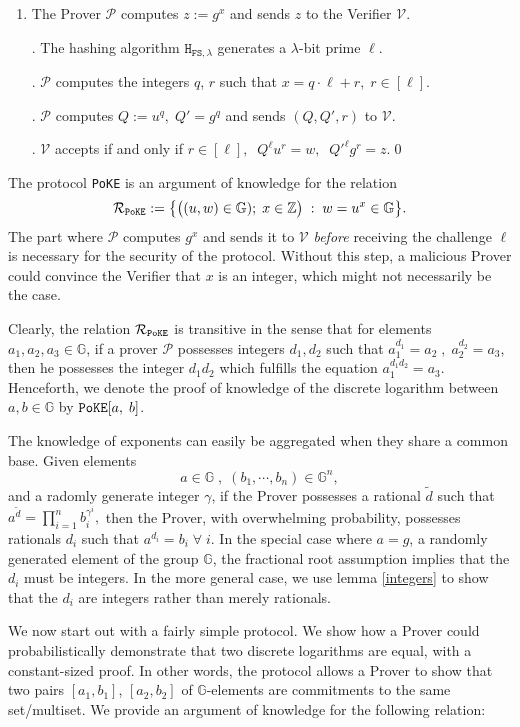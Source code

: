 \documentclass[11pt, lettersize, notitlepage, leqno, footskip=0.6cm]{article}
\newcommand{\bz}{\mathbb Z}
\newcommand{\ttt}{\texttt}
\newcommand{\bG}{\mathbb{G}}
\newcommand{\wti}{\widetilde}
\newcommand{\mc}{\mathcal}
\newcommand{\mb}{\mathbb}
\newcommand{\lam}{\lambda}
\newcommand{\lamb}{\lambda}
\newcommand{\mP}{\mc{P}}
\newcommand{\vs}{\vspace{-0.15cm}}
\newcommand{\noin}{\noindent}
\numberwithin{equation}{section}
\begin{document}
\begin{enumerate}[wide, labelwidth=!, labelindent=0pt]\vs \item The Prover $\mc{P}$ computes $z:= g^x$ and sends $z$ to the Verifier $\mc{V}$.

. The hashing algorithm $\ttt{H}_{\ttt{FS},\lam}$ generates a $\lamb$-bit prime $\ell$.

. $\mc{P}$ computes the integers $q$, $r$ such that $x = q \cdot \ell+r,\; r\in [\ell].$

. $\mc{P}$ computes $Q:= u^q,\; Q' = g^q$ and sends $(Q, Q', r)$ to $\mc{V}$.

. $\mc{V}$ accepts if and only if $r\in [\ell],\;\; Q^{\ell}u^r =  w,\;\; Q'^{\ell}g^r = z. $\qed \end{enumerate}

\noin The protocol \verb|PoKE| is an argument of knowledge for the relation \vs $$\mc{R}_{\tt{PoKE}}:= \big\{\big((u,w)\in \bG);\; x\in \bz\big)\;:\; w = u^x \in \bG  \big\}.$$ The part where $\mc{P}$ computes $g^x$ and sends it to $\mc{V}$ \textit{before} receiving the challenge $\ell$ is necessary for the security of the protocol. Without this step, a malicious Prover could convince the Verifier that $x$ is an integer, which might not necessarily be the case.

Clearly, the relation $\mc{R}_{\tt{PoKE}}$ is transitive in the sense that for elements $a_1,a_2,a_3\in\mb{G}$, if a prover $\mP$ possesses integers $d_1,d_2$ such that $a_1^{d_1} = a_2\;,\;a_2^{d_2} = a_3$, then he possesses the integer $d_1d_2$ which fulfills the equation $a_1^{d_1d_2} = a_3$. Henceforth, we denote the proof of knowledge of the discrete logarithm between $a,b\in\mb{G}$ by $\verb|PoKE|[a,\;b]$.

The knowledge of exponents can easily be aggregated when they share a common base. Given elements \vs $$a\in\mb{G}\;,\;(b_1,\cdots,b_n)\in\mb{G}^n, $$ and a radomly generate integer $\gamma$, if the Prover possesses a rational $\wti{d}$ such that $a^{\wti{d}} = \prod_{i=1}^n b_i^{\gamma^i},$ then the Prover, with overwhelming probability, possesses rationals $d_i$ such that $a^{d_i} = b_i\;\forall\;i$. In the special case where $a = g$, a randomly generated element of the group $\bG$, the fractional root assumption implies that the $d_i$ must be integers. In the more general case, we use lemma \ref{integers} to show that the $d_i$ are integers rather than merely rationals.

We now start out with a fairly simple protocol. We show how a Prover could probabilistically demonstrate that two discrete logarithms are equal, with a constant-sized proof. In other words, the protocol allows a Prover to show that two pairs $[a_1, b_1]$, $[a_2, b_2]$ of $\bG$-elements are commitments to the same set/multiset. We provide an argument of knowledge for  the following relation:\vs
\end{document}
